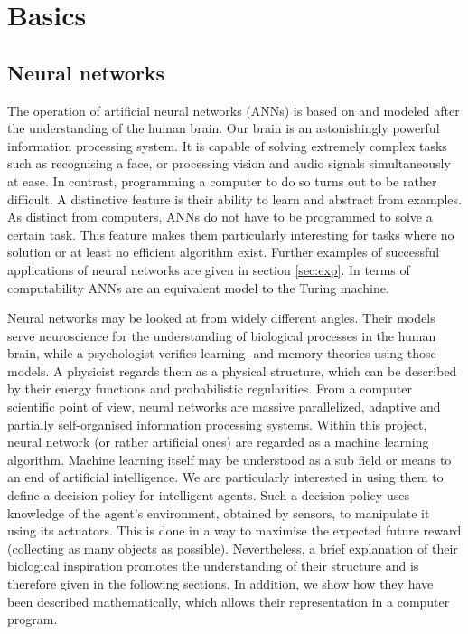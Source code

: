 \documentclass[10pt,a4paper,DIV=11]{scrreprt}
\begin{document}
\chapter{Basics}
\label{ch:basics}
\section{Neural networks}
The operation of artificial neural networks (ANNs) is based on and modeled after the understanding of the human brain. 
Our brain is an astonishingly powerful information processing system. It is capable of solving extremely complex tasks such as recognising a face, or
processing vision and audio signals simultaneously at ease. In contrast, programming a computer to do so turns out to be rather difficult.
A distinctive feature is their ability to learn and abstract from examples. As distinct from computers, ANNs do not have to be programmed to solve 
a certain task. This feature makes them particularly interesting for tasks where no solution or at least no efficient algorithm
exist. Further examples of successful applications of neural networks are given in section \ref{sec:exp}.
In terms of computability ANNs are an equivalent model to the Turing machine.\cite{NURING}

Neural networks may be looked at from widely different angles. Their models serve neuroscience for the understanding of biological processes 
in the human brain, while a psychologist verifies learning- and memory theories using those models. A physicist regards them as a physical structure,
which can be described by their energy functions and probabilistic regularities. From a computer scientific point of view, neural networks
are massive parallelized, adaptive and partially self-organised information processing systems. \cite{NNGER}
Within this project, neural network (or rather artificial ones) are regarded as a machine learning algorithm. 
Machine learning itself may be understood as a sub field or means to an end of artificial intelligence.
We are particularly interested in using them to define a decision policy for intelligent agents. Such a decision policy uses knowledge of the agent's
environment, obtained by sensors, to manipulate it using its actuators. This is done in a way to maximise the expected future reward (collecting as
many objects as possible). Nevertheless, a brief explanation of their biological inspiration promotes the understanding of their structure and is 
therefore given in the following sections. In addition, we show how they have been described mathematically, which allows their representation 
in a computer program.
\end{document}

